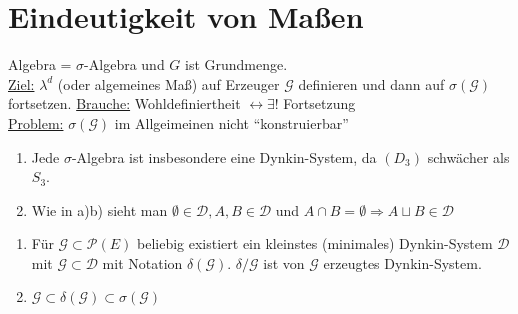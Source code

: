 \section{Eindeutigkeit von Maßen}
Algebra = $\sigma$-Algebra und $G$ ist Grundmenge.\\
\underline{Ziel:} $\lambda^d$ (oder algemeines Maß) auf Erzeuger $\mathscr{G}$ definieren und dann auf $\sigma(\mathscr{G})$ fortsetzen.
\underline{Brauche:} Wohldefiniertheit $\longleftrightarrow \exists !$ Fortsetzung\\
\underline{Problem:} $\sigma(\mathscr{G})$ im Allgeimeinen nicht ``konstruierbar''\\

\begin{definition}[\person{Dynkin}-System}]
	$\mathscr{D} \subset \mathscr{P}(E)$ heißt }, wenn
	\begin{itemize}
		\item $(D_1)$ $E \in \mathscr{D}$
		\item $(D_2)$ $D \in \mathscr{D} \Rightarrow D^C \in \mathscr{D}$
		\item $(D_3)$ $(D_n)_{n\in \natur} \subset \mathscr{D}$ und paarweise Disjunktheit $\Rightarrow \biguplus_{n \in \natur} D_n \in \mathscr{D}$
	\end{itemize}
\end{definition}

\begin{remark}
	\begin{enumerate}[label=(\alph*)]
		\item Jede $\sigma$-Algebra ist insbesondere eine Dynkin-System, da $(D_3)$ schwächer als $S_3$.
		\item Wie in a)b) sieht man $\emptyset \in \mathscr{D}, A,B \in \mathscr{D}$ und $A \cap B = \emptyset \Rightarrow A \sqcup B \in \mathscr{D}$
	\end{enumerate}
\end{remark}

\begin{proposition}
	\begin{enumerate}[label=(\alph*)]
		\item Für $\mathscr{G} \subset \mathscr{P}(E)$ beliebig existiert ein kleinstes (minimales) Dynkin-System $\mathscr{D}$ mit $\mathscr{G} \subset \mathscr{D}$ mit Notation $\delta(\mathscr{G})$. $\delta/\mathscr{G}$ ist von $\mathscr{G}$ erzeugtes Dynkin-System.
		\item $\mathscr{G} \subset \delta(\mathscr{G}) \subset \sigma(\mathscr{G})$
	\end{enumerate}
\end{proposition}

